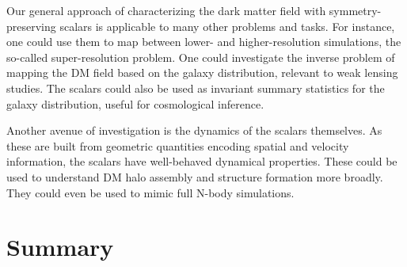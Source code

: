Our general approach of characterizing the dark matter field with symmetry-preserving scalars is applicable to many other problems and tasks.
For instance, one could use them to map between lower- and higher-resolution simulations, the so-called super-resolution problem.
One could investigate the inverse problem of mapping the DM field based on the galaxy distribution, relevant to weak lensing studies.
The scalars could also be used as invariant summary statistics for the galaxy distribution, useful for cosmological inference.

Another avenue of investigation is the dynamics of the scalars themselves.
As these are built from geometric quantities encoding spatial and velocity information, the scalars have well-behaved dynamical properties.
These could be used to understand DM halo assembly and structure formation more broadly.
They could even be used to mimic full N-body simulations.


\section{Summary}
\label{sec:summary}

